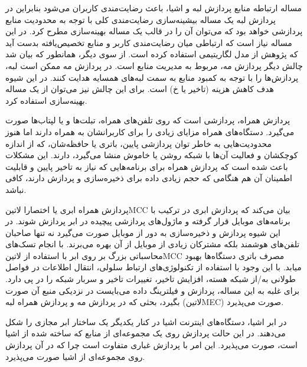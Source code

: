مساله ارتباطه منابع پردازش لبه و اشیا، باعث رضایت‌مندی کاربران می‌شود بنابراین در پردازش لبه یک مساله بیشینه‌سازی رضایت‌مندی کلی با توجه به محدودیت منابع پردازشی خواهد بود
که می‌توان آن را در قالب یک مساله بهینه‌سازی مطرح کرد. در این مساله نیاز است که ارتباطی میان رضایت‌مندی کاربر و منابع تخصیص‌یافته بدست آید که پژوهش  از مدل
لگاریتیمی استفاده کرده است.
از سوی دیگر، همانطور که بیان شد چالش دیگر پردازش مه، مربوط به مدیریت منابع است. در پردازش مه ممکن است لبه‌، پردازش‌ها را با توجه به کمبود منابع به سمت لبه‌های همسایه هدایت کنند.
در این شیوه هدف کاهش هزینه (تاخیر یا ‌خ) است. برای این چالش نیز می‌توان از یک مساله بهینه‌سازی استفاده کرد.


پردازش همراه، پردازشی است که روی تلفن‌های همراه، تبلت‌ها و یا لپتاب‌ها صورت می‌گیرد. دستگاه‌های همراه مزایای زیادی را برای کاربرانشان به همراه دارند اما هنوز
محدودیت‌هایی به خاطر توان پردازشی پایین، باتری یا حافظه‌شان، که از اندازه کوچکشان و فعالیت آن‌ها با شبکه روشن یا خاموش منشا می‌گیرد، دارند.
این مشکلات باعث شده است که پردازش همراه برای برنامه‌هایی که نیاز به تاخیر پایین و قابلیت اطمینان آن هم هنگامی که حجم زیادی داده برای ذخیره‌سازی و پردازش دارند، کافی نباشد.


پردازش همراه ابری یا اختصارا ‌لاتین{MCC} بیان می‌کند که پردازش ابری در ترکیب با برنامه‌های موبایل قرار گرفته و ماژول‌های پردازشی پیچیده در ابر پردازش شوند.
در این شیوه پردازش و ذخیره‌سازی به دور از موبایل صورت می‌گیرد نه تنها صاحبان تلفن‌های هوشمند بلکه مشترکان زیادی از موبایل از آن بهره می‌برند.
با انجام تسک‌های محاسباتی بزرگ بر روی ابر با استفاده از ‌لاتین{MCC} مصرف باتری دستگاه‌ها بهبود میابد.
با این وجود با استفاده از تکنولوژی‌های ارتباط سلولی، انتقال اطلاعات در فواصل طولانی به/از شبکه هسته، افزایش تاخیر، تغییرات تاخیر و سربار شبکه را در پی دارد.
برای غلبه به این مساله، پردازش و فیلترینگ داده می‌بایست در نزدیکی منبع آن صورت بگیرد، بحثی که در پردازش مه و پردازش همراه لبه (‌لاتین{MEC}) صورت می‌پذیرد.


در ابر اشیا، دستگاه‌های اینترنت اشیا در کنار یکدیگر یک ساختار ابر مجازی را شکل می‌دهند. در این حالت پردازش روی یک مجموعه‌ای از منابع که ساخته شده از اشیا است، صورت می‌پذیرد.
این امر با پردازش غباری متفاوت است چرا که در آن پردازش روی مجموعه‌ای از اشیا صورت می‌پذیرد.


